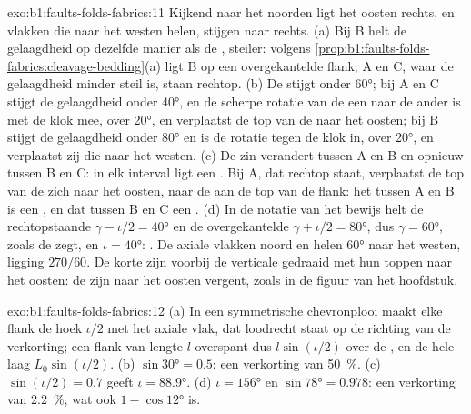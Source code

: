 \begin{solution}{exo:b1:faults-folds-fabrics:11}
Kijkend naar het noorden ligt het oosten rechts, en vlakken die naar het westen helen, stijgen naar
rechts. (a) Bij B helt de gelaagdheid op dezelfde manier als de , steiler:
volgens \cref{prop:b1:faults-folds-fabrics:cleavage-bedding}(a) ligt B op een
overgekantelde flank; A en C, waar de gelaagdheid minder steil is, staan rechtop.
(b) De  stijgt onder \ang{60}; bij A en C stijgt de gelaagdheid onder
\ang{40}, en de scherpe rotatie van de een naar de ander is met de klok mee, over
\ang{20}, en verplaatst de top van de  naar het oosten; bij B stijgt de gelaagdheid
onder \ang{80} en is de rotatie tegen de klok in, over \ang{20}, en verplaatst zij die naar
het westen. (c) De zin verandert tussen A en B en opnieuw tussen B en C: in elk interval
ligt een . Bij A, dat rechtop staat, verplaatst de top van de
 zich naar het oosten, naar de  aan de top van de flank: het 
tussen A en B is een , en dat tussen B en C een .
(d) In de notatie van het bewijs helt de rechtopstaande 
$\gamma - \iota/2 = \ang{40}$ en de overgekantelde  $\gamma + \iota/2 =
\ang{80}$, dus $\gamma = \ang{60}$, zoals de  zegt, en $\iota =
\ang{40}$: . De axiale vlakken  noord en helen \ang{60} naar het
westen, ligging $270/60$. De korte  zijn voorbij de verticale gedraaid met
hun toppen naar het oosten: de  zijn naar het oosten vergent, zoals in de figuur van
het hoofdstuk.
\end{solution}

\begin{solution}{exo:b1:faults-folds-fabrics:12}
(a) In een symmetrische chevronplooi maakt elke flank de hoek $\iota/2$ met het axiale vlak, dat loodrecht staat op de richting van de verkorting; een flank van lengte $l$ overspant dus $l\sin(\iota/2)$ over de , en de hele laag $L_0\sin(\iota/2)$. (b) $\sin\ang{30} = 0.5$: een verkorting van
\qty{50}{\percent}. (c) $\sin(\iota/2) = 0.7$ geeft $\iota = \ang{88.9}$.
(d) $\iota = \ang{156}$ en $\sin\ang{78} = 0.978$: een verkorting van
\qty{2.2}{\percent}, wat ook $1 - \cos\ang{12}$ is.
\end{solution}

